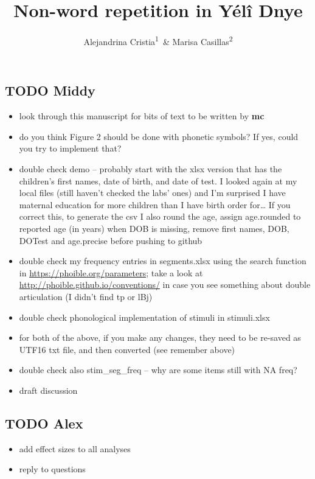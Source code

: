 \documentclass[english,,man,floatsintext]{apa6}
\title{Non-word repetition in Yélî Dnye}
\author{Alejandrina Cristia\textsuperscript{1}~\& Marisa Casillas\textsuperscript{2}}
\date{}
\providecommand{\tightlist}{%
  \setlength{\itemsep}{0pt}\setlength{\parskip}{0pt}}
\begin{document}
\maketitle

\hypertarget{todo-middy}{%
\subsection{TODO Middy}\label{todo-middy}}

\begin{itemize}
\tightlist
\item
  look through this manuscript for bits of text to be written by \textbf{mc}
\item
  do you think Figure 2 should be done with phonetic symbols? If yes, could you try to implement that?
\item
  double check demo -- probably start with the xlsx version that has the children's first names, date of birth, and date of test. I looked again at my local files (still haven't checked the labs' ones) and I'm surprised I have maternal education for more children than I have birth order for\ldots{} If you correct this, to generate the csv I also round the age, assign age.rounded to reported age (in years) when DOB is missing, remove first names, DOB, DOTest and age.precise before pushing to github
\item
  double check my frequency entries in segments.xlsx using the search function in \url{https://phoible.org/parameters}; take a look at \url{http://phoible.github.io/conventions/} in case you see something about double articulation (I didn't find tp or lBj)
\item
  double check phonological implementation of stimuli in stimuli.xlsx
\item
  for both of the above, if you make any changes, they need to be re-saved as UTF16 txt file, and then converted (see remember above)
\item
  double check also stim\_seg\_freq -- why are some items still with NA freq?
\item
  draft discussion
\end{itemize}

\hypertarget{todo-alex}{%
\subsection{TODO Alex}\label{todo-alex}}

\begin{itemize}
\tightlist
\item
  add effect sizes to all analyses
\item
  reply to questions
\end{itemize}
\end{document}

